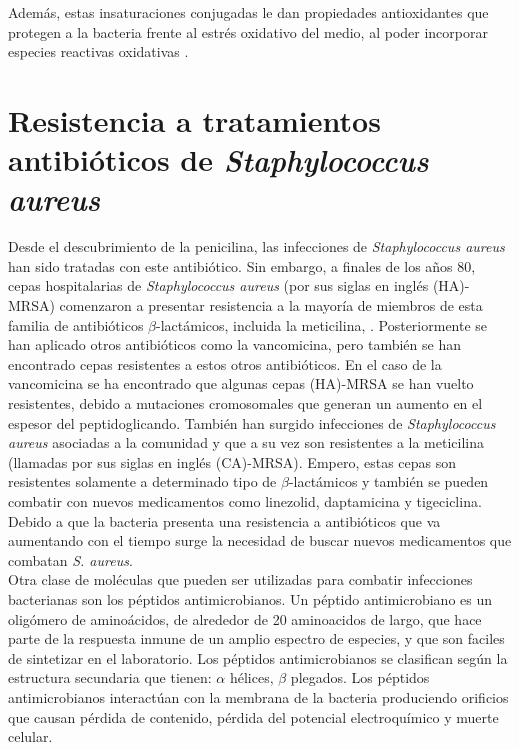  Adem\'{a}s, estas insaturaciones conjugadas le dan propiedades antioxidantes que protegen a la bacteria frente al estr\'{e}s oxidativo del medio, al poder incorporar especies reactivas oxidativas \cite{Nelson2011}.
\section{Resistencia a tratamientos antibi\'{o}ticos de \textit{Staphylococcus aureus}}\label{ss:anti}
Desde el descubrimiento de la penicilina, las infecciones de \textit{Staphylococcus aureus} han sido tratadas con este antibi\'{o}tico. Sin embargo, a finales de los a\~{n}os 80, cepas hospitalarias de \textit{Staphylococcus aureus} (por sus siglas en ingl\'{e}s (HA)-MRSA) comenzaron a presentar resistencia a la mayor\'{i}a de miembros de esta familia de antibi\'{o}ticos $\beta$-lact\'{a}micos, incluida la meticilina, \cite{Foster2014StaphylococcusAureus}. Posteriormente se han aplicado otros antibi\'{o}ticos como la vancomicina, pero tambi\'{e}n se han encontrado cepas resistentes a estos otros antibi\'{o}ticos. En el caso de la vancomicina se ha encontrado que algunas cepas (HA)-MRSA se han vuelto resistentes, debido a mutaciones cromosomales que generan un aumento en el espesor del peptidoglicando. Tambi\'{e}n han surgido infecciones de \textit{Staphylococcus aureus}  asociadas a la comunidad y que a su vez son resistentes a la meticilina (llamadas por sus siglas en ingl\'{e}s (CA)-MRSA). Empero, estas cepas son resistentes solamente a determinado tipo de $\beta$-lact\'{a}micos y tambi\'{e}n se pueden combatir con nuevos  medicamentos como 
linezolid, daptamicina y tigeciclina.\\
Debido a que la bacteria presenta una resistencia a antibi\'{o}ticos que va aumentando con el tiempo surge la necesidad de buscar nuevos medicamentos que combatan \textit{S. aureus}.\\

Otra clase de mol\'{e}culas que pueden ser utilizadas para combatir infecciones bacterianas son los p\'eptidos antimicrobianos.
Un p\'eptido antimicrobiano es  un olig\'omero de amino\'acidos, de alrededor de 20 aminoacidos de largo, que hace parte de la respuesta inmune de un amplio espectro de especies, y que son faciles de sintetizar en el laboratorio. Los p\'{e}ptidos antimicrobianos se clasifican seg\'{u}n la estructura secundaria que tienen: $\alpha$ h\'elices, $\beta$ plegados.   Los p\'eptidos antimicrobianos interact\'uan con la membrana de la bacteria produciendo orificios que causan p\'erdida de contenido, p\'{e}rdida del potencial electroqu\'{i}mico y muerte celular.\\

